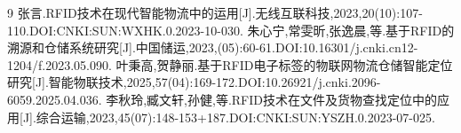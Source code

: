 \documentclass[a4paper, 12pt]{article}
\begin{document}
\begin{thebibliography}{9}
     张言.RFID技术在现代智能物流中的运用[J].无线互联科技,2023,20(10):107-110.DOI:CNKI:SUN:WXHK.0.2023-10-030.
     朱心宁,常雯昕,张逸晨,等.基于RFID的溯源和仓储系统研究[J].中国储运,2023,(05):60-61.DOI:10.16301/j.cnki.cn12-1204/f.2023.05.090.
     叶秉高,贺静丽.基于RFID电子标签的物联网物流仓储智能定位研究[J].智能物联技术,2025,57(04):169-172.DOI:10.26921/j.cnki.2096-6059.2025.04.036.
     李秋玲,臧文轩,孙健,等.RFID技术在文件及货物查找定位中的应用[J].综合运输,2023,45(07):148-153+187.DOI:CNKI:SUN:YSZH.0.2023-07-025.
\end{thebibliography}
\end{document}

